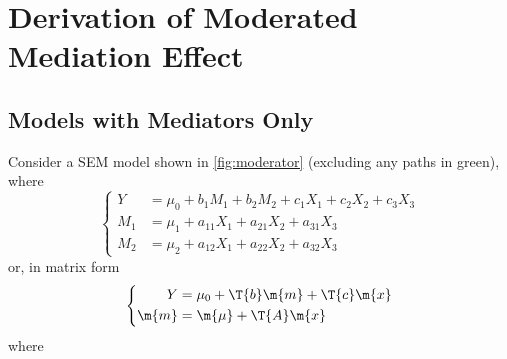 \chapter[Derivation of Moderated Mediation Effect]{Derivation of Moderated\\Mediation Effect}

\section{Models with Mediators Only}

Consider a SEM model 
shown in \cref{fig:moderator} (excluding any paths in green), where
\begin{equation*}
    \left\{
    \begin{aligned}
        Y &= \mu_0 + b_1M_1 + b_2M_2 + c_1X_1 + c_2X_2 + c_3X_3\\
        M_1 &= \mu_1 + a_{11}X_1 + a_{21}X_2 + a_{31}X_3\\
        M_2 &= \mu_2 + a_{12}X_1 + a_{22}X_2 + a_{32}X_3
    \end{aligned}
    \right.
\end{equation*}
or, in matrix form
\begin{equation}
    \left\{
    \begin{aligned}
        Y &= \mu_0 + \T{b}\m{m} + \T{c}\m{x}\\
        \m{m} &= \m{\mu} + \T{A}\m{x}
    \end{aligned}
    \right.
\end{equation}
where
